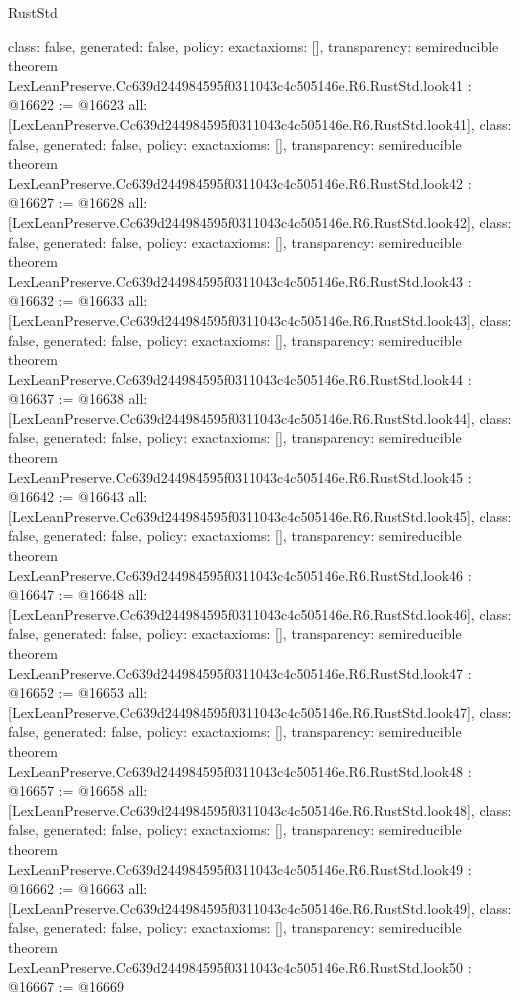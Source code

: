 \begin{lexlean}{RustStd}
\begin{coremodule}
{  class: false,
  generated: false,
  policy: exact{axioms: []},
  transparency: semireducible
}
theorem LexLeanPreserve.Cc639d244984595f0311043c4c505146e.R6.RustStd.look41 : @16622 := @16623 {
  all: [LexLeanPreserve.Cc639d244984595f0311043c4c505146e.R6.RustStd.look41],
  class: false,
  generated: false,
  policy: exact{axioms: []},
  transparency: semireducible
}
theorem LexLeanPreserve.Cc639d244984595f0311043c4c505146e.R6.RustStd.look42 : @16627 := @16628 {
  all: [LexLeanPreserve.Cc639d244984595f0311043c4c505146e.R6.RustStd.look42],
  class: false,
  generated: false,
  policy: exact{axioms: []},
  transparency: semireducible
}
theorem LexLeanPreserve.Cc639d244984595f0311043c4c505146e.R6.RustStd.look43 : @16632 := @16633 {
  all: [LexLeanPreserve.Cc639d244984595f0311043c4c505146e.R6.RustStd.look43],
  class: false,
  generated: false,
  policy: exact{axioms: []},
  transparency: semireducible
}
theorem LexLeanPreserve.Cc639d244984595f0311043c4c505146e.R6.RustStd.look44 : @16637 := @16638 {
  all: [LexLeanPreserve.Cc639d244984595f0311043c4c505146e.R6.RustStd.look44],
  class: false,
  generated: false,
  policy: exact{axioms: []},
  transparency: semireducible
}
theorem LexLeanPreserve.Cc639d244984595f0311043c4c505146e.R6.RustStd.look45 : @16642 := @16643 {
  all: [LexLeanPreserve.Cc639d244984595f0311043c4c505146e.R6.RustStd.look45],
  class: false,
  generated: false,
  policy: exact{axioms: []},
  transparency: semireducible
}
theorem LexLeanPreserve.Cc639d244984595f0311043c4c505146e.R6.RustStd.look46 : @16647 := @16648 {
  all: [LexLeanPreserve.Cc639d244984595f0311043c4c505146e.R6.RustStd.look46],
  class: false,
  generated: false,
  policy: exact{axioms: []},
  transparency: semireducible
}
theorem LexLeanPreserve.Cc639d244984595f0311043c4c505146e.R6.RustStd.look47 : @16652 := @16653 {
  all: [LexLeanPreserve.Cc639d244984595f0311043c4c505146e.R6.RustStd.look47],
  class: false,
  generated: false,
  policy: exact{axioms: []},
  transparency: semireducible
}
theorem LexLeanPreserve.Cc639d244984595f0311043c4c505146e.R6.RustStd.look48 : @16657 := @16658 {
  all: [LexLeanPreserve.Cc639d244984595f0311043c4c505146e.R6.RustStd.look48],
  class: false,
  generated: false,
  policy: exact{axioms: []},
  transparency: semireducible
}
theorem LexLeanPreserve.Cc639d244984595f0311043c4c505146e.R6.RustStd.look49 : @16662 := @16663 {
  all: [LexLeanPreserve.Cc639d244984595f0311043c4c505146e.R6.RustStd.look49],
  class: false,
  generated: false,
  policy: exact{axioms: []},
  transparency: semireducible
}
theorem LexLeanPreserve.Cc639d244984595f0311043c4c505146e.R6.RustStd.look50 : @16667 := @16669 {
}
\end{coremodule}
\end{lexlean}
